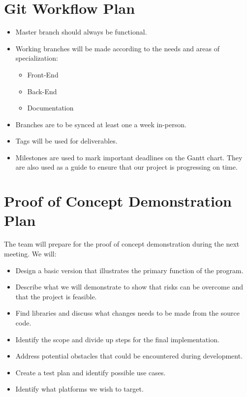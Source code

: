 \documentclass{article}
\begin{document}
\section{Git Workflow Plan}
\begin{itemize}
\item Master branch should always be functional.
\item Working branches will be made according to the needs and areas of specialization:
\begin{itemize}
\item Front-End
\item Back-End
\item Documentation
\end{itemize}

\item Branches are to be synced at least one a week in-person. 
\item Tags will be used for deliverables.

\item Milestones are used to mark important deadlines on the Gantt chart. They are also used as a guide to ensure that our project is progressing on time.

\end{itemize}

\section{Proof of Concept Demonstration Plan}

The team will prepare for the proof of concept demonstration during the next meeting. We will:

\begin{itemize}
\item Design a basic version that illustrates the primary function of the program.
\item Describe what we will demonstrate to show that risks can
be overcome and that the project is feasible.
\item Find libraries and discuss what changes needs to be made from the source code.
\item Identify the scope and divide up steps for the final implementation.
\item Address potential obstacles that could be encountered during development.
\item Create a test plan and identify possible use cases.
\item Identify what platforms we wish to target.

\end{itemize}
\end{document}
